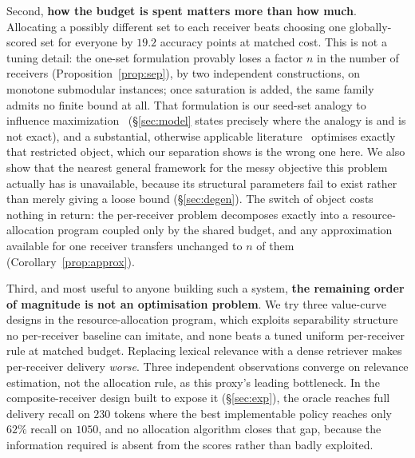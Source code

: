 \documentclass[sigconf,anonymous]{aamas}
\theoremstyle{remark}
\begin{document}
Second, \textbf{how the budget is spent matters more than how much}.
Allocating a possibly different set to each receiver beats choosing one
globally-scored set for everyone by $19.2$ accuracy points at matched
cost. This is not a tuning detail: the one-set formulation provably loses a
factor $n$ in the number of receivers (Proposition~\ref{prop:sep}), by
two independent constructions, on monotone submodular instances; once
saturation is added, the same family admits no finite bound at all.
That formulation is our seed-set analogy to influence
maximization~\cite{kempe2003} (\S\ref{sec:model} states precisely where
the analogy is and is not exact), and a substantial, otherwise
applicable literature~\cite{borgs2014,tang2015,eim2025} optimises
exactly that restricted object, which our separation shows is the
wrong one here. We also show that the nearest general
framework for the messy objective this problem actually has is
unavailable, because its structural parameters fail to exist rather
than merely giving a loose bound (\S\ref{sec:degen}). The switch of
object costs nothing in return: the per-receiver problem decomposes
exactly into a resource-allocation program coupled only by the shared
budget, and any approximation available for one receiver transfers
unchanged to $n$ of them (Corollary~\ref{prop:approx}).

Third, and most useful to anyone building such a system,
\textbf{the remaining order of magnitude is not an optimisation
problem}. We try three value-curve designs in the resource-allocation
program, which exploits separability structure no per-receiver
baseline can imitate, and none beats a tuned uniform per-receiver rule
at matched budget.
Replacing lexical relevance with a dense retriever makes per-receiver
delivery \emph{worse}. Three independent observations converge on
relevance estimation, not the allocation rule, as this proxy's leading
bottleneck. In the
composite-receiver design built to expose it (\S\ref{sec:exp}), the
oracle reaches full delivery recall on $230$ tokens where the best
implementable policy reaches only $62\%$ recall on $1050$, and no
allocation algorithm closes that gap, because the information required
is absent from the scores rather than badly exploited.
\end{document}
